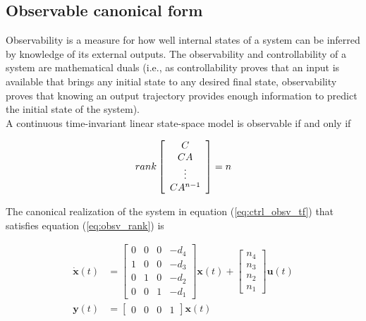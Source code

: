 \documentclass[10pt,conference,compsoc]{IEEEtran}
\newcommand{\mtx}[1] {\bm #1}
\begin{document}
\subsection{Observable canonical form} \label{subsec:obsv_canon}

Observability is a measure for how well internal \glspl{state} of a \gls{system}
can be inferred by knowledge of its external outputs. The observability and
controllability of a \gls{system} are mathematical duals (i.e., as
controllability proves that an input is available that brings any initial
\gls{state} to any desired final \gls{state}, observability proves that knowing
an output trajectory provides enough information to predict the initial
\gls{state} of the \gls{system}). \\

A continuous \gls{time-invariant} linear state-space model is observable if and
only if

\begin{equation} \label{eq:obsv_rank}
  rank \left[
  \begin{array}{c}
    C \\
    CA \\
    \vdots \\
    CA^{n-1}
  \end{array}
  \right] = n \\
\end{equation}

The canonical realization of the \gls{system} in equation
(\ref{eq:ctrl_obsv_tf}) that satisfies equation (\ref{eq:obsv_rank}) is

\begin{align}
  \dot{\mtx{x}}(t) &= \left[
  \begin{array}{cccc}
    0 & 0 & 0 & -d_4 \\
    1 & 0 & 0 & -d_3 \\
    0 & 1 & 0 & -d_2 \\
    0 & 0 & 1 & -d_1
  \end{array}
  \right] \mtx{x}(t) + \left[
  \begin{array}{c}
    n_4 \\
    n_3 \\
    n_2 \\
    n_1
  \end{array}
  \right] \mtx{u}(t) \\
  \mtx{y}(t) &= \left[
  \begin{array}{cccc}
    0 & 0 & 0 & 1
  \end{array}
  \right] \mtx{x}(t)
\end{align}
\end{document}
